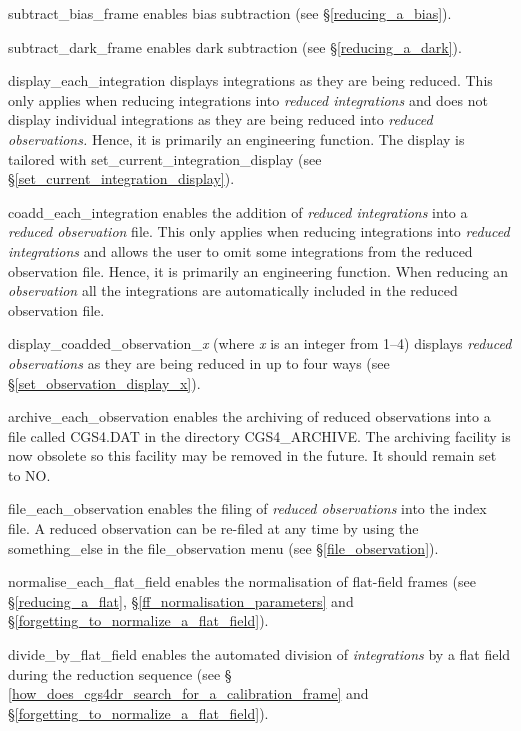 {{\sf subtract\_bias\_frame} enables bias subtraction 
(see \S \ref{reducing_a_bias}).

{\sf subtract\_dark\_frame} enables dark subtraction 
(see \S \ref{reducing_a_dark}).

{\sf display\_each\_integration} displays integrations as they are being reduced.
This only applies when reducing integrations into {\em reduced integrations} 
and does not display individual integrations as they are being reduced into 
{\em reduced observations.} Hence, it is primarily an engineering function. 
The display is tailored with {\sf set\_current\_integration\_display} 
(see \S \ref{set_current_integration_display}).

{\sf coadd\_each\_integration} enables the addition of {\em reduced integrations}
into a {\em reduced observation} file. This only applies when reducing 
integrations into {\em reduced integrations} and allows the user to omit some 
integrations from the reduced observation file. Hence, it is primarily an 
engineering function. When reducing an {\em observation} all the integrations 
are automatically included in the reduced observation file.

{\sf display\_coadded\_observation\_{\em x}} (where {\em x} is an integer from 
1--4) displays {\em reduced observations} as they are being reduced in up to 
four ways (see \S \ref{set_observation_display_x}).

{\sf archive\_each\_observation} enables the archiving of reduced observations
into a file called {\sf CGS4.DAT} in the directory {\sf CGS4\_ARCHIVE}. The 
archiving facility is now obsolete so this facility may be removed in the 
future. It should remain set to {\sf NO}.

{\sf file\_each\_observation} enables the filing of {\em reduced observations} 
into the index file. A reduced observation can be re-filed at any time by 
using the {\sf something\_else} in the {\sf file\_observation} menu (see 
\S \ref{file_observation}).

{\sf normalise\_each\_flat\_field} enables the normalisation of flat-field frames
(see \S \ref{reducing_a_flat}, \S \ref{ff_normalisation_parameters} and 
\S \ref{forgetting_to_normalize_a_flat_field}).

{\sf divide\_by\_flat\_field} enables the automated division of 
{\em integrations} by a flat field during the reduction sequence (see \S 
\ref{how_does_cgs4dr_search_for_a_calibration_frame} and
\S \ref{forgetting_to_normalize_a_flat_field}).

}
